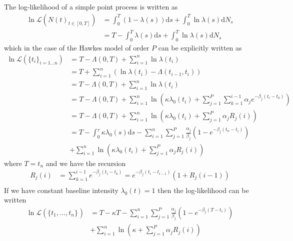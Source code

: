 \documentclass{amsart}
\newcommand{\mathd}{\mathrm{d}}
\begin{document}
The log-likelihood of a simple point process is written as
\begin{equation}
  \begin{array}{ll}
    \text{} \ln \mathcal{L} ( N ( t)_{t \in [ 0, T]}) & = \int_0^T ( 1 -
    \lambda ( s)) \mathd s + \int_0^T \ln \lambda ( s) \mathd N_s\\
    & = T - \int_0^T \lambda ( s) \mathd s + \int_0^T \ln \lambda ( s) \mathd
    N_s
  \end{array}
\end{equation}
which in the case of the Hawkes model of order $P$ can be explicitly written
{\cite{ozaki1979maximum}} as
\begin{equation}
  \begin{array}{ll}
    \ln \mathcal{L} ( \{ t_i \}_{i = 1 \ldots n}) & =_{} T - \Lambda ( 0, T) +
    \sum_{i = 1}^n \ln \lambda ( t_i)\\
    & = T + \sum_{i = 1}^n ( \ln \lambda ( t_i) - \Lambda ( t_{i - 1},
    t_i))\\
    & = T - \Lambda ( 0, T) + \sum_{i = 1}^n \ln \lambda ( t_i)\\
    & =_{} T - \Lambda ( 0, T) + \sum_{i = 1}^n \ln \left( \kappa \lambda_0 (
    t_i) + \sum_{j = 1}^P \sum_{k = 1}^{i - 1} \alpha_j e^{- \beta_j ( t_i -
    t_k)} \right)\\
    & =_{} T - \Lambda ( 0, T) + \sum_{i = 1}^n \ln \left( \kappa \lambda_0 (
    t_i) + \sum_{j = 1}^P \alpha_j R_j ( i) \right)\\
    & = T - \int_0^{_T} \kappa \lambda_0 ( s) \mathd s - \sum_{i = 1}^n
    \sum_{j = 1}^P \frac{\alpha_j}{\beta_j} ( 1 - e^{- \beta_j ( t_n -
    t_i)})\\
    & + \sum_{i = 1}^n \ln \left( \kappa \lambda_0 ( t_i) + \sum_{j = 1}^P
    \alpha_j R_j ( i) \right)
  \end{array}
\end{equation}
where $T = t_n$ and we have the recursion{\cite{ogata1981lewis}}
\begin{equation}
  \begin{array}{ll}
    R_j ( i) & = \sum_{k = 1}^{i - 1} e^{- \beta_j ( t_i - t_k)} = e^{-
    \beta_j ( t_i - t_{i - 1})} ( 1 + R_j ( i - 1))\\
    & 
  \end{array}
\end{equation}
If we have constant baseline intensity $\lambda_0 ( t) = 1$ then the
log-likelihood can be written
\begin{equation}
  \begin{array}{ll}
    \ln \mathcal{L} ( \{ t_1, \ldots, t_n \}_{}) & = T - \kappa T - \sum_{i =
    1}^n \sum_{j = 1}^P \frac{\alpha_j}{\beta_j} ( 1 - e^{- \beta_j ( T -
    t_i)})\\
    & + \sum_{i = 1}^n \ln \left( \kappa + \sum_{j = 1}^P \alpha_j R_j ( i)
    \right)
  \end{array} \text{} \label{hawkesll}
\end{equation}
\end{document}

